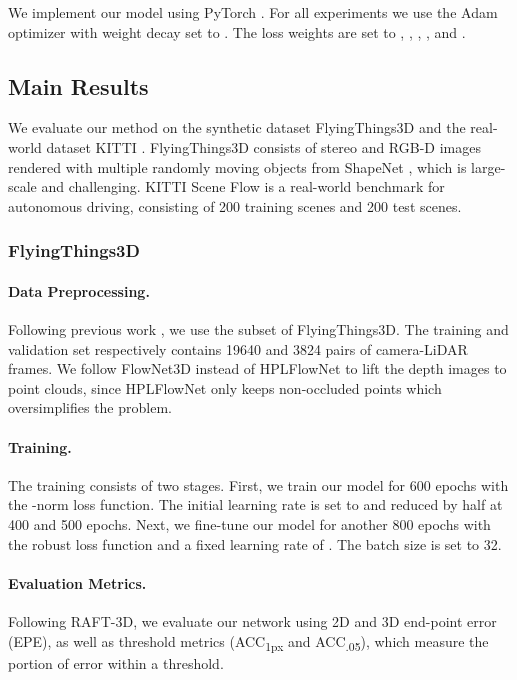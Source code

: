 \documentclass[10pt,twocolumn,letterpaper]{article}
\begin{document}
We implement our model using PyTorch \cite{paszke2019pytorch}. For all experiments we use the Adam optimizer \cite{kingma2014adam} with weight decay set to . The loss weights are set to , , , , and .

\subsection{Main Results}

We evaluate our method on the synthetic dataset FlyingThings3D \cite{mayer2016things3d} and the real-world dataset KITTI \cite{menze2015osf}. FlyingThings3D consists of stereo and RGB-D images rendered with multiple randomly moving objects from ShapeNet \cite{chang2015shapenet}, which is large-scale and challenging. KITTI Scene Flow is a real-world benchmark for autonomous driving, consisting of 200 training scenes and 200 test scenes.

\subsubsection{FlyingThings3D}

\paragraph{Data Preprocessing.} Following previous work \cite{ilg2017flownet2, gu2019hplflownet, wu2019pointpwc}, we use the subset of FlyingThings3D. The training and validation set respectively contains 19640 and 3824 pairs of camera-LiDAR frames. We follow FlowNet3D \cite{liu2019flownet3d} instead of HPLFlowNet \cite{gu2019hplflownet} to lift the depth images to point clouds, since HPLFlowNet only keeps non-occluded points which oversimplifies the problem. 

\vspace{-10pt}
\paragraph{Training.} The training consists of two stages. First, we train our model for 600 epochs with the -norm loss function. The initial learning rate is set to  and reduced by half at 400 and 500 epochs. Next, we fine-tune our model for another 800 epochs with the robust loss function and a fixed learning rate of . The batch size is set to 32.

\vspace{-10pt}
\paragraph{Evaluation Metrics.} Following RAFT-3D, we evaluate our network using 2D and 3D end-point error (EPE), as well as threshold metrics (ACC\textsubscript{1px} and ACC\textsubscript{.05}), which measure the portion of error within a threshold.
\end{document}

